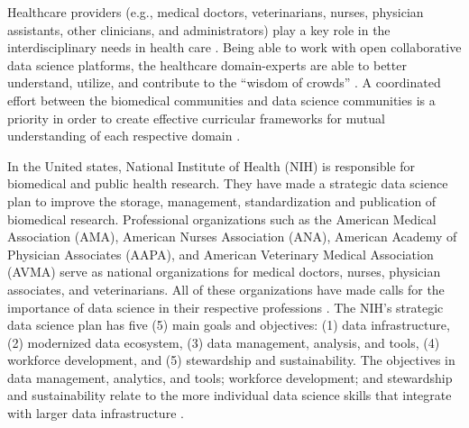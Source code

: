 \documentclass[020-persona\_validation.tex]{subfiles}
\begin{document}
    Healthcare providers
    (e.g., medical doctors, veterinarians, nurses, physician assistants, other clinicians, and administrators)
    play a key role in the interdisciplinary needs in health care
    \cite{surowiecki2005wisdom, hoytOverviewTwoOpen2018, payneBiomedicalInformaticsMeets2018}.
    Being able to work with open collaborative data science platforms,
    the healthcare domain-experts are able to better understand, utilize, and contribute to the
    ``wisdom of crowds''
    \cite{surowiecki2005wisdom, hoytOverviewTwoOpen2018, payneBiomedicalInformaticsMeets2018}.
    A coordinated effort between the biomedical communities and data science communities
    is a priority in order to create effective curricular frameworks for mutual understanding
    of each respective domain
    \cite{payneBiomedicalInformaticsMeets2018}.

    In the United states,
    National Institute of Health (NIH) is responsible for biomedical and public health research.
    They have made a strategic data science plan to improve the
    storage, management, standardization and publication of biomedical research.
    Professional organizations such as the
    American Medical Association (AMA),
    American Nurses Association (ANA),
    American Academy of Physician Associates (AAPA), and
    American Veterinary Medical Association (AVMA)
    serve as national organizations for medical doctors, nurses, physician associates, and veterinarians.
    All of these organizations have made calls for the importance of data science in their respective professions
    \cite{payneBiomedicalInformaticsMeets2018, americanmedicalassociationAcceleratingChangeMedical2021, americannursesassociationANAEnterpriseAmerican, owenEthicalIntersectionHealthcare2017, nolenArtificialIntelligenceVeterinary2020, nationalinstitutesofhealthNIHStrategicPlan2020}.
    The NIH's strategic data science plan has five (5) main goals and objectives:
    (1) data infrastructure,
    (2) modernized data ecosystem,
    (3) data management, analysis, and tools,
    (4) workforce development, and
    (5) stewardship and sustainability. %
    The objectives in
    data management, analytics, and tools;
    workforce development;
    and stewardship and sustainability
    relate to the more individual data science skills that integrate with larger data infrastructure
    \cite{nationalinstitutesofhealthNIHStrategicPlan2020}.

\end{document}
